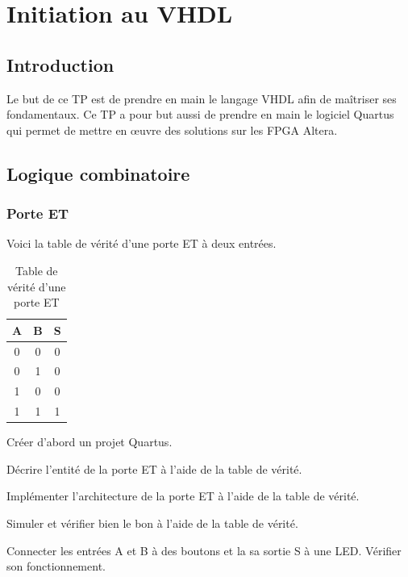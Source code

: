 \chapter{Initiation au VHDL}
\section{Introduction}
Le but de ce TP est de prendre en main le langage VHDL afin de maîtriser ses fondamentaux. Ce TP a pour but aussi de prendre en main le logiciel Quartus qui permet de mettre en œuvre des solutions sur les FPGA Altera.
\section{Logique combinatoire}
\subsection{Porte ET}
Voici la table de vérité d'une porte ET à deux entrées.
\begin{table}[ht]
    \centering
    \begin{tabular}{c c|c} 
        A & B & S \\
        \hline
        0 & 0 & 0 \\
        0 & 1 & 0 \\
        1 & 0 & 0 \\
        1 & 1 & 1
    \end{tabular}
    \caption{Table de vérité d'une porte ET}
\end{table}

Créer d'abord un projet Quartus.

\medskip

Décrire l'entité de la porte ET à l'aide de la table de vérité.

\medskip

Implémenter l'architecture de la porte ET à l'aide de la table de vérité.

\medskip

Simuler et vérifier bien le bon à l'aide de la table de vérité.

\medskip

Connecter les entrées A et B à des boutons et la sa sortie S à une LED. Vérifier son fonctionnement.
